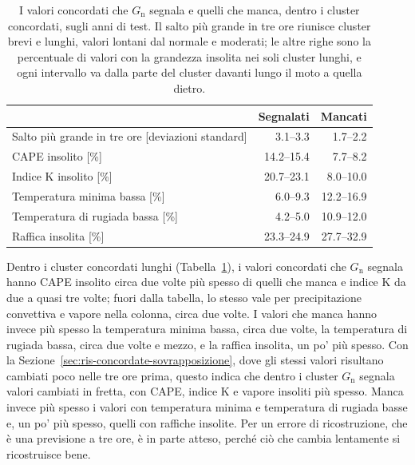 \begin{table}[!t]
    \centering
    \footnotesize
    \caption{I valori concordati che $G_{\mathrm{n}}$ segnala e quelli che manca, dentro i cluster concordati, sugli anni di test. Il salto più grande in tre ore riunisce cluster brevi e lunghi, valori lontani dal normale e moderati; le altre righe sono la percentuale di valori con la grandezza insolita nei soli cluster lunghi, e ogni intervallo va dalla parte del cluster davanti lungo il moto a quella dietro.}
    \label{tab:ris-giudici-dentro}
    \vspace{0.6em}
    \begin{tabular}{@{}lrr@{}}
        \toprule
         & Segnalati & Mancati \\
        \midrule
        Salto più grande in tre ore [deviazioni standard] & 3.1--3.3 & 1.7--2.2 \\
        \addlinespace
        CAPE insolito [\%] & 14.2--15.4 & 7.7--8.2 \\
        Indice K insolito [\%] & 20.7--23.1 & 8.0--10.0 \\
        Temperatura minima bassa [\%] & 6.0--9.3 & 12.2--16.9 \\
        Temperatura di rugiada bassa [\%] & 4.2--5.0 & 10.9--12.0 \\
        Raffica insolita [\%] & 23.3--24.9 & 27.7--32.9 \\
        \bottomrule
    \end{tabular}
\end{table}

Dentro i cluster concordati lunghi (Tabella~\ref{tab:ris-giudici-dentro}), i valori concordati che $G_{\mathrm{n}}$ segnala hanno CAPE insolito circa due volte più spesso di quelli che manca e indice K da due a quasi tre volte; fuori dalla tabella, lo stesso vale per precipitazione convettiva e vapore nella colonna, circa due volte.
I valori che manca hanno invece più spesso la temperatura minima bassa, circa due volte, la temperatura di rugiada bassa, circa due volte e mezzo, e la raffica insolita, un po' più spesso. Con la Sezione~\ref{sec:ris-concordate-sovrapposizione}, dove gli stessi valori risultano cambiati poco nelle tre ore prima, questo indica che dentro i cluster $G_{\mathrm{n}}$ segnala valori cambiati in fretta, con CAPE, indice K e vapore insoliti più spesso. Manca invece più spesso i valori con temperatura minima e temperatura di rugiada basse e, un po' più spesso, quelli con raffiche insolite. Per un errore di ricostruzione, che è una previsione a tre ore, è in parte atteso, perché ciò che cambia lentamente si ricostruisce bene.

